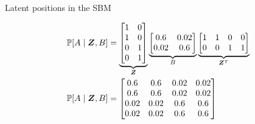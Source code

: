 \documentclass{beamer}
\theoremstyle{remark}
\newcommand{\Z}{\bm Z}
\DeclarePairedDelimiter{\brac}{[}{]}
\renewcommand{\P}[2][]{%
   \ifthenelse{ \equal{#1}{} }
      {\ensuremath{\mathbb{P} \brac*{#2}}}
      {\ensuremath{\mathbb{P} \brac*{#2 \mid #1}}}
}
\begin{document}
\begin{frame}{Latent positions in the SBM}

    \begin{align*}
        \P[\Z, B]{A} & =
        \underbrace{
            \begin{bmatrix}
                1 & 0 \\
                1 & 0 \\
                0 & 1 \\
                0 & 1 \\
            \end{bmatrix}
        }_{\Z}
        \underbrace{
            \begin{bmatrix}
                0.6  & 0.02 \\
                0.02 & 0.6
            \end{bmatrix}
        }_{B}
        \underbrace{
            \begin{bmatrix}
                1 & 1 & 0 & 0 \\
                0 & 0 & 1 & 1 \\
            \end{bmatrix}
        }_{\Z^T}         \\
        \P[\Z, B]{A} & =
        \begin{bmatrix}
            0.6  & 0.6  & 0.02 & 0.02 \\
            0.6  & 0.6  & 0.02 & 0.02 \\
            0.02 & 0.02 & 0.6  & 0.6  \\
            0.02 & 0.02 & 0.6  & 0.6  \\
        \end{bmatrix}
    \end{align*}

\end{frame}
\end{document}
